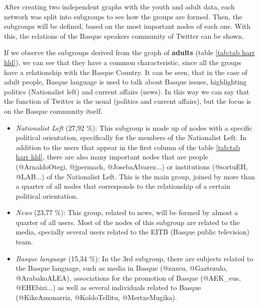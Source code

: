\documentclass[information,article,submit,moreauthors,pdftex,10pt,a4paper]{Definitions/mdpi}
\begin{document}
After creating two independent graphs with the youth and adult data, each network was split into subgroups to see how the groups are formed. Then, the subgroups will be defined, based on the most important nodes of each one. With this, the relations of the Basque speakers community of Twitter can be shown.

If we observe the subgroups derived from the graph of \textbf{adults} (table \ref{tab:tab harr hld}), we can see that they have a common characteristic, since all the groups have a relationship with the Basque Country. It can be seen, that in the case of adult people, Basque language is used to talk about Basque issues, highlighting politics (Nationalist left) and current affairs (news). In this way we can say that the function of Twitter is the usual (politics and current affairs), but the focus is on the Basque community itself.

\begin{itemize}
\item \textit{Nationalist Left} (27,92 \%): This subgroup is made up of nodes with a specific political orientation, specifically for the members of the Nationalist Left. In addition to the users that appear in the first column of the table \ref{tab:tab harr hld}, there are also many important nodes that are people (@ArnaldoOtegi, @jpermach, @JosebaAlvarez...) or institutions (@sortuEH, @LAB...) of the Nationalist Left. This is the main group, joined by more than a quarter of all nodes that corresponds to the relationship of a certain political orientation.
\end{itemize}

\begin{itemize}
\item \textit{News} (23,77 \%): This group, related to news, will be formed by almost a quarter of all users. Most of the nodes of this subgroup are related to the media, specially several users related to the EITB (Basque public television) team. 
\end{itemize}

\begin{itemize}
\item \textit{Basque language} (15,34 \%): In the 3rd subgroup, there are subjects related to the Basque language, such as media in Basque (@zuzeu, @Gaztezulo, @ArabakoALEA), associations for the promotion of Basque (@AEK\_eus, @EHEbizi...) as well as several individuals related to Basque (@KikeAmonarriz, @KoldoTellitu, @MertxeMugika).
\end{itemize}
\end{document}
